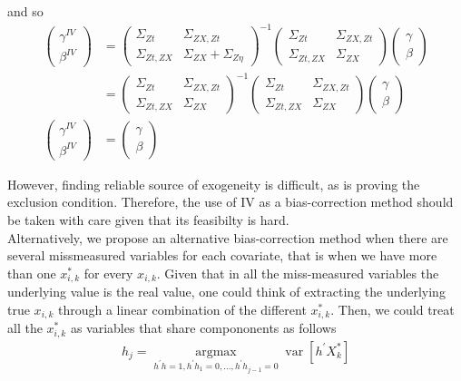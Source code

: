 \documentclass[12pt]{article}
\begin{document}
    and so
    \begin{align}
        \left(\begin{array}{l}
    {\gamma}^{IV} \\
    {\beta}^{IV}
    \end{array}\right)
    & =\left(\begin{array}{cc}
    {\Sigma}_{Zt} & \Sigma_{ZX,Zt} \\
    \Sigma_{Zt,ZX}& {\Sigma}_{ZX}+{\Sigma}_{Z\eta}
    \end{array}\right)^{-1}\left(\begin{array}{cc}
    {\Sigma}_{Zt} & \Sigma_{ZX,Zt} \\
    \Sigma_{Zt,ZX} & {\Sigma}_{ZX}
    \end{array}\right)\left(\begin{array}{l}
    {\gamma} \\
    {\beta}
    \end{array}\right)\\
    & =\left(\begin{array}{cc}
    {\Sigma}_{Zt} & \Sigma_{ZX,Zt} \\
    \Sigma_{Zt,ZX}& {\Sigma}_{ZX}
    \end{array}\right)^{-1}\left(\begin{array}{cc}
    {\Sigma}_{Zt} & \Sigma_{ZX,Zt} \\
    \Sigma_{Zt,ZX} & {\Sigma}_{ZX}
    \end{array}\right)\left(\begin{array}{l}
    {\gamma} \\
    {\beta}
    \end{array}\right) \\
    \left(\begin{array}{l}
    {\gamma}^{IV} \\
    {\beta}^{IV}
    \end{array}\right)
    & =\left(\begin{array}{l}
    {\gamma} \\
    {\beta}
    \end{array}\right)
    \end{align}

    However, finding reliable source of exogeneity is difficult, as is proving the exclusion condition. Therefore, the use of IV as a bias-correction method should be taken with care given that its feasibilty is hard.\\

    Alternatively, we propose an alternative bias-correction method when there are several missmeasured variables for each covariate, that is when we have more than one $x_{i,k}^*$ for every $x_{i,k}$. Given that in all the miss-measured variables the underlying value is the real value, one could think of extracting the underlying true $x_{i,k}$ through a linear combination of the different $x_{i,k}^*$. Then, we could treat all the $x_{i,k}^*$ as variables that share compononents as follows
    \begin{align}
    h_{j}=\underset{h^{\prime} h=1, h^{\prime} h_{1}=0, \ldots, h^{\prime} h_{j-1}=0}{\operatorname{argmax}} \operatorname{var}\left[h^{\prime} X^*_k\right]  
    \end{align}
\end{document}
